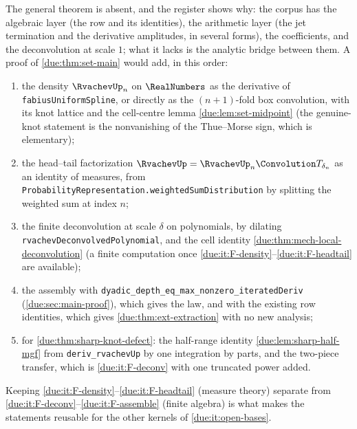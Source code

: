 \documentclass[11pt,oneside]{article}
\theoremstyle{plain}
\theoremstyle{definition}
\theoremstyle{remark}
\newcommand{\upn}[1]{\RvachevUp_{#1}}
\begin{document}
The general theorem is absent, and the register shows why: the corpus has
the algebraic layer (the row and its identities), the arithmetic layer
(the jet termination and the derivative amplitudes, in several forms), the
coefficients, and the deconvolution at scale $1$; what it lacks is the
analytic bridge between them.  A proof of \cref{due:thm:set-main} would
add, in this order:
\begin{sloppypar}
\begin{enumerate}[label=\textup{(F\arabic*)}]
\item\label{due:it:F-density}
 the density $\upn{n}$ on $\RealNumbers$ as the derivative of
 \texttt{fabiusUniformSpline}, or directly as the $(n+1)$-fold box
 convolution, with its knot lattice and the cell-centre lemma
 \cref{due:lem:set-midpoint} (the genuine-knot statement is the nonvanishing
 of the Thue--Morse sign, which is elementary);
\item\label{due:it:F-headtail}
 the head--tail factorization $\RvachevUp=\upn{n}\Convolution T_{\delta_{n}}$
 as an identity of measures, from
 \texttt{ProbabilityRepresentation.\allowbreak weightedSumDistribution} by splitting the
 weighted sum at index $n$;
\item\label{due:it:F-deconv}
 the finite deconvolution at scale $\delta$ on polynomials, by dilating
 \texttt{rvachevDeconvolvedPolynomial}, and the cell identity
 \cref{due:thm:mech-local-deconvolution} (a finite computation once
 \ref{due:it:F-density}--\ref{due:it:F-headtail} are available);
\item\label{due:it:F-assemble}
 the assembly with \texttt{dyadic\_\allowbreak depth\_\allowbreak eq\_\allowbreak max\_\allowbreak nonzero\_\allowbreak iteratedDeriv}
 (\cref{due:sec:main-proof}), which gives the law, and with the existing
 row identities, which gives \cref{due:thm:ext-extraction} with no new
 analysis;
\item\label{due:it:F-knot}
 for \cref{due:thm:sharp-knot-defect}: the half-range identity
 \cref{due:lem:sharp-half-mgf} from \texttt{deriv\_rvachevUp} by one
 integration by parts, and the two-piece transfer, which is
 \ref{due:it:F-deconv} with one truncated power added.
\end{enumerate}
\end{sloppypar}
Keeping \ref{due:it:F-density}--\ref{due:it:F-headtail} (measure theory)
separate from \ref{due:it:F-deconv}--\ref{due:it:F-assemble} (finite
algebra) is what makes the statements reusable for the other kernels of
\cref{due:it:open-bases}.
\end{document}
